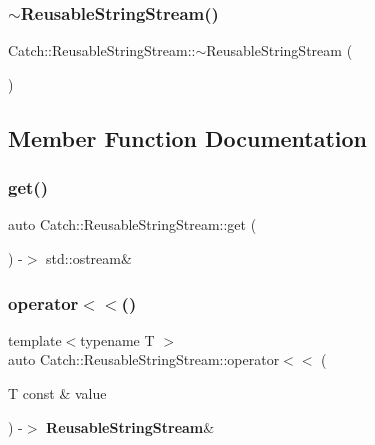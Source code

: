 \mbox{\label{class_catch_1_1_reusable_string_stream_aba9384e258a4db3178447b6a58414712}} 
\subsubsection{$\sim$ReusableStringStream()}
{\footnotesize\ttfamily Catch\+::\+Reusable\+String\+Stream\+::$\sim$\+Reusable\+String\+Stream (\begin{DoxyParamCaption}{ }\end{DoxyParamCaption})}



\subsection{Member Function Documentation}
\mbox{\label{class_catch_1_1_reusable_string_stream_a6881808c60a080d4e24a0b81c94cbf67}} 
\subsubsection{get()}
{\footnotesize\ttfamily auto Catch\+::\+Reusable\+String\+Stream\+::get (\begin{DoxyParamCaption}{ }\end{DoxyParamCaption}) -\/$>$ std\+::ostream\& \hspace{0.3cm}{\ttfamily [inline]}}

\mbox{\label{class_catch_1_1_reusable_string_stream_af95f72024c082db70e5e50782e28e4f6}} 
\subsubsection{operator$<$$<$()}
{\footnotesize\ttfamily template$<$typename T $>$ \\
auto Catch\+::\+Reusable\+String\+Stream\+::operator$<$$<$ (\begin{DoxyParamCaption}\item[{T const \&}]{value }\end{DoxyParamCaption}) -\/$>$ \textbf{ Reusable\+String\+Stream}\& \hspace{0.3cm}{\ttfamily [inline]}}

